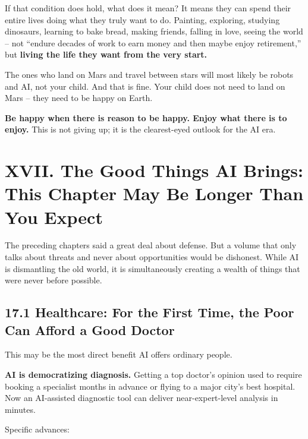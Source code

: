 \documentclass[11pt,a4paper]{article}
\begin{document}
If that condition does hold, what does it mean? It means they can spend their entire lives doing what they truly want to do. Painting, exploring, studying dinosaurs, learning to bake bread, making friends, falling in love, seeing the world -- not ``endure decades of work to earn money and then maybe enjoy retirement,'' but \textbf{living the life they want from the very start.}

The ones who land on Mars and travel between stars will most likely be robots and AI, not your child. And that is fine. Your child does not need to land on Mars -- they need to be happy on Earth.

\textbf{Be happy when there is reason to be happy. Enjoy what there is to enjoy.} This is not giving up; it is the clearest-eyed outlook for the AI era.

\section{XVII. The Good Things AI Brings: This Chapter May Be Longer Than You Expect}

The preceding chapters said a great deal about defense. But a volume that only talks about threats and never about opportunities would be dishonest. While AI is dismantling the old world, it is simultaneously creating a wealth of things that were never before possible.

\subsection{17.1 Healthcare: For the First Time, the Poor Can Afford a Good Doctor}

This may be the most direct benefit AI offers ordinary people.

\textbf{AI is democratizing diagnosis.} Getting a top doctor's opinion used to require booking a specialist months in advance or flying to a major city's best hospital. Now an AI-assisted diagnostic tool can deliver near-expert-level analysis in minutes.

Specific advances:
\end{document}
